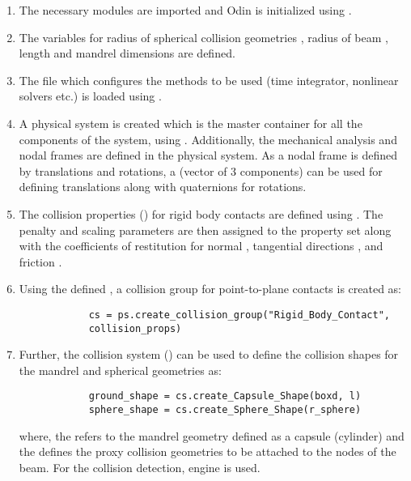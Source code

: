 \begin{enumerate}
    \item The necessary modules are imported and Odin is initialized using .
    \item The variables for radius of spherical collision geometries , radius of beam , length  and mandrel dimensions are defined.
    \item The  file which configures the methods to be used (time integrator, nonlinear solvers etc.) is loaded using .
    \item A physical system is created which is the master container for all the components of the system, using . Additionally, the mechanical analysis and nodal frames are defined in the physical system. As a nodal frame is defined by translations and rotations, a  (vector of 3 components) can be used for defining translations along with quaternions for rotations.
    \item The collision properties () for rigid body contacts are defined using . The penalty and scaling parameters are then assigned to the property set along with the coefficients of restitution for normal , tangential directions , and friction .
    \item Using the defined  , a collision group for point-to-plane contacts is created as:
        \pythonstyle
        \begin{lstlisting}
            cs = ps.create_collision_group("Rigid_Body_Contact", 
            collision_props)
        \end{lstlisting}
    \item Further, the collision system () can be used to define the collision shapes for the mandrel and spherical geometries as:
        \pythonstyle
        \begin{lstlisting}
            ground_shape = cs.create_Capsule_Shape(boxd, l)
            sphere_shape = cs.create_Sphere_Shape(r_sphere)
        \end{lstlisting}
    where, the  refers to the mandrel geometry defined as a capsule (cylinder) and the  defines the proxy collision geometries to be attached to the nodes of the beam. For the collision detection,  engine is used.

\end{enumerate}
